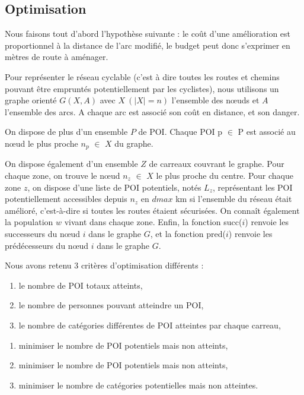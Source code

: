 \documentclass[a4paper,12pt,french]{article}
\begin{document}
\subsection{Optimisation}

Nous faisons tout d'abord l'hypothèse suivante : le coût d'une amélioration est proportionnel à la distance de l'arc modifié, le budget peut donc s'exprimer en mètres de route à aménager.

Pour représenter le réseau cyclable (c'est à dire toutes les routes et chemins pouvant être empruntés potentiellement par les cyclistes), nous utilisons un graphe orienté $G(X, A)$ avec $X \ ( \vert X \vert = n)$ l'ensemble des nœuds et $A$ l'ensemble des arcs. A chaque arc est associé son coût en distance, et son danger. 

On dispose de plus d'un ensemble $P$ de POI. Chaque POI p $\in$ P est associé au nœud le plus proche $n_p$ $\in$ $X$ du graphe. 

On dispose également d'un ensemble $Z$ de carreaux couvrant le graphe. Pour chaque zone, on trouve le nœud $n_z$ $\in$ $X$ le plus proche du centre. Pour chaque zone $z$, on dispose d'une liste de POI potentiels, notés $L_z$, représentant les POI potentiellement accessibles depuis $n_z$ en $dmax$ km si l'ensemble du réseau était amélioré, c'est-à-dire si toutes les routes étaient sécurisées. On connaît également la population $w$ vivant dans chaque zone. Enfin, la fonction succ($i$) renvoie les successeurs du nœud $i$ dans le graphe $G$, et la fonction pred($i$) renvoie les prédécesseurs du nœud $i$ dans le graphe $G$.

Nous avons retenu 3 critères d'optimisation différents :

\begin{enumerate}
    \item le nombre de POI totaux atteints, 
    \item le nombre de personnes pouvant atteindre un POI, 
    \item le nombre de catégories différentes de POI atteintes par chaque carreau,
\end{enumerate}

\begin{enumerate}
    \item minimiser le nombre de POI potentiels mais non atteints, 
    \item minimiser le nombre de POI potentiels mais non atteints, 
    \item minimiser le nombre de catégories potentielles mais non atteintes.
\end{enumerate}
\end{document}
